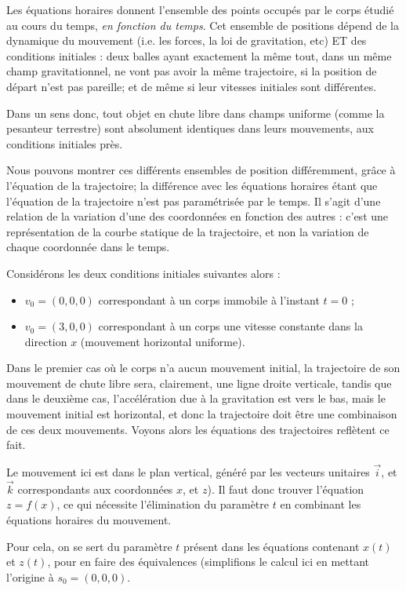 \documentclass[11pt,a4paper]{article}
\begin{document}
Les équations horaires donnent l'ensemble des points occupés par le corps étudié au cours du temps, \textit{en fonction du temps}. Cet ensemble de positions dépend de la dynamique du mouvement (i.e. les forces, la loi de gravitation, etc) ET des conditions initiales : deux balles ayant exactement la même tout, dans un même champ gravitationnel, ne vont pas avoir la même trajectoire, si la position de départ n'est pas pareille; et de même si leur vitesses initiales sont différentes. 

Dans un sens donc, tout objet en chute libre dans champs uniforme (comme la pesanteur terrestre) sont absolument identiques dans leurs mouvements, aux conditions initiales près. 

Nous pouvons montrer ces différents ensembles de position différemment, grâce à l'équation de la trajectoire; la différence avec les équations horaires étant que l'équation de la trajectoire n'est pas paramétrisée par le temps. Il s'agit d'une relation de la variation d'une des coordonnées en fonction des autres : c'est une représentation de la courbe statique de la trajectoire, et non la variation de chaque coordonnée dans le temps. 

Considérons les deux conditions initiales suivantes alors : 
\begin{itemize}
    \item $v_0 = (0,0,0) $ correspondant à un corps immobile à l'instant $t=0$ ; 
    \item $v_0 = (3,0,0) $ correspondant à un corps une vitesse constante dans la direction $x$ (mouvement horizontal uniforme). 
\end{itemize}

Dans le premier cas où le corps n’a aucun mouvement initial, la trajectoire de son mouvement de chute libre sera, clairement, une ligne droite verticale, tandis que dans le deuxième cas, l'accélération due à la gravitation est vers le bas, mais le mouvement initial est horizontal, et donc la trajectoire doit être une combinaison de ces deux mouvements. Voyons alors les équations des trajectoires reflètent ce fait. 

Le mouvement ici est dans le plan vertical, généré par les vecteurs unitaires $\Vec{i}$, et $\Vec{k}$ correspondants aux coordonnées $x$, et $z$).  Il faut donc trouver l’équation $z=f(x)$, ce qui nécessite l’élimination du paramètre $t$ en combinant les équations horaires du mouvement. 

Pour cela, on se sert du paramètre $t$ présent dans les équations contenant $x(t)$ et $z(t)$, pour en faire des équivalences (simplifions le calcul ici en mettant l'origine à $s_0 = (0,0,0) $. 
\end{document}
